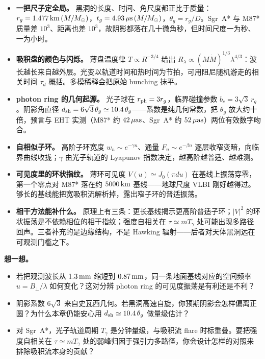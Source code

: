 \begin{itemize}
\item \textbf{一把尺子定全局。} 黑洞的长度、时间、角尺度都正比于质量：\(r_g=1.477\,{\rm km}\,(M/M_\odot)\)，\(t_g=4.93\,\mu{\rm s}\,(M/M_\odot)\)，\(\theta_g=r_g/D\)。Sgr~A* 与 M87* 质量差 \(10^3\)、距离也差 \(10^3\)，故阴影都落在几十微角秒，但时间尺度一为秒、一为小时。
\item \textbf{吸积盘的颜色与闪烁。} 薄盘温度律 \(T\propto R^{-3/4}\) 给出 \(R_\lambda\propto(M\dot M)^{1/3}\lambda^{4/3}\)：波长越长来自越外层。光变以轨道时间和热时间为节拍，可用阻尼随机游走的相关时间 \(\tau_d\) 概括。多模稀释会把原始 bunching 抹平。
\item \textbf{photon ring 的几何起源。} 光子球在 \(r_{\rm ph}=3r_g\)，临界碰撞参数 \(b_c=3\sqrt3\,r_g\)。阴影角直径 \(d_{\rm sh}=6\sqrt3\,\theta_g\simeq10.4\,\theta_g\)——系数是纯几何常数，把 \(\theta_g\) 放大约十倍，预言与 EHT 实测（M87* 约 \(42\,\mu{\rm as}\)、Sgr~A* 约 \(52\,\mu{\rm as}\)）两位有效数字吻合。
\item \textbf{自相似子环。} 高阶子环宽度 \(w_n\sim e^{-\gamma n}\)、通量 \(F_n\sim e^{-\beta n}\) 逐层收窄变暗，向临界曲线收拢；\(\gamma\) 由光子轨道的 Lyapunov 指数决定，越高阶越普适、越难测。
\item \textbf{可见度里的环状指纹。} 薄环可见度 \(V(u)\simeq J_0(\pi d u)\) 在基线上振荡穿零，第一个零点对 M87* 落在约 \(5000\,{\rm km}\) 基线——地球尺度 VLBI 刚好越得过。够长的基线能把宽吸积流解析掉，露出窄子环的普适振荡。
\item \textbf{相干方法能补什么。} 原理上有三条：更长基线揭示更高阶普适子环；\(|V|^2\) 的环状振荡是不依赖相位的相干指纹；强度自相关在 \(\tau\simeq mT_\gamma\) 处可能出现多路径回声。三者补充的是边缘结构，不是 Hawking 辐射——后者对天体黑洞远在可观测门槛之下。
\end{itemize}

\noindent\textbf{想一想。}
\begin{itemize}
\item 若把观测波长从 \(1.3\,{\rm mm}\) 缩短到 \(0.87\,{\rm mm}\)，同一条地面基线对应的空间频率 \(u=B_\perp/\lambda\) 如何变化？这对分辨 photon ring 的可见度振荡是有利还是不利？
\item 阴影系数 \(6\sqrt3\) 来自史瓦西几何。若黑洞高速自旋，你预期阴影会怎样偏离正圆？为什么本章仍能安心用 \(d_{\rm sh}\simeq10.4\,\theta_g\) 做量级估计？
\item 对 Sgr~A*，光子轨道周期 \(T_\gamma\) 是分钟量级，与吸积流 flare 时标重叠。要把强度自相关在 \(\tau\simeq mT_\gamma\) 处的弱峰归因于强引力多路径，你会设计怎样的对照来排除吸积流本身的贡献？
\end{itemize}
